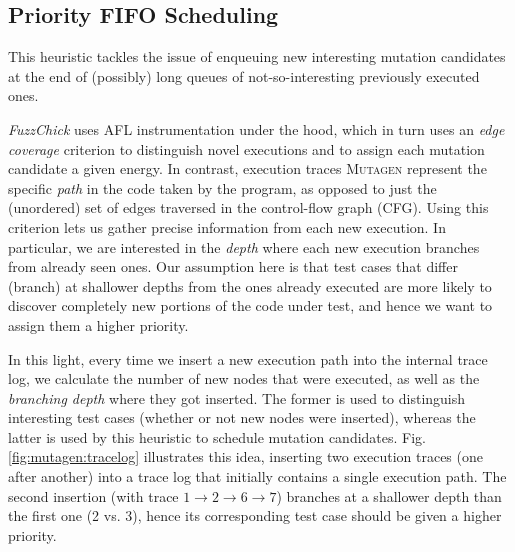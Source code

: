 \documentclass[sigconf, anonymous]{acmart}
\newcommand{\fuzzchick}{\textit{FuzzChick}\xspace}
\newcommand{\mutagen}{\textsc{Mutagen}\xspace}
\begin{document}
\subsection{Priority FIFO Scheduling}

This heuristic tackles the issue of enqueuing new interesting mutation
candidates at the end of (possibly) long queues of not-so-interesting previously
executed ones.

\fuzzchick uses AFL instrumentation under the hood, which in turn uses an
\emph{edge coverage} criterion to distinguish novel executions and to assign
each mutation candidate a given energy.
%
In contrast, execution traces \mutagen represent the specific \emph{path} in the
code taken by the program, as opposed to just the (unordered) set of edges
traversed in the control-flow graph (CFG).
%
Using this criterion lets us gather precise information from each new execution.
%
In particular, we are interested in the \emph{depth} where each new execution
branches from already seen ones.
%
Our assumption here is that test cases that differ (branch) at shallower depths
from the ones already executed are more likely to discover completely new
portions of the code under test, and hence we want to assign them a higher
priority.


In this light, every time we insert a new execution path into the internal trace
log, we calculate the number of new nodes that were executed, as well as the
\emph{branching depth} where they got inserted.
%
The former is used to distinguish interesting test cases (whether or not new
nodes were inserted), whereas the latter is used by this heuristic to schedule
mutation candidates.
%
Fig. \ref{fig:mutagen:tracelog} illustrates this idea, inserting two execution
traces (one after another) into a trace log that initially contains a single
execution path.
%
The second insertion (with trace $1 \rightarrow 2 \rightarrow 6 \rightarrow 7$)
branches at a shallower depth than the first one (2 vs. 3), hence its
corresponding test case should be given a higher priority.
\end{document}
